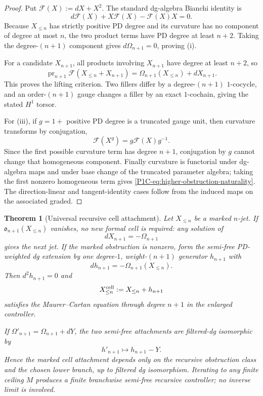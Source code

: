 \documentclass[11pt]{article}
\newtheorem{theorem}{Theorem}[section]
\theoremstyle{remark}
\begin{document}
\begin{proof}
Put $\mathcal F(X):=dX+X^2$.  The standard dg-algebra Bianchi identity is
\[
 d\mathcal F(X)+X\mathcal F(X)-\mathcal F(X)X=0.
\]
Because $X_{\le n}$ has strictly positive PD degree and its curvature has no component of degree at most $n$, the two product terms have PD degree at least $n+2$.  Taking the degree-$(n+1)$ component gives $d\Omega_{n+1}=0$, proving (i).

For a candidate $X_{n+1}$, all products involving $X_{n+1}$ have degree at least $n+2$, so
\[
 \operatorname{pr}_{n+1}\mathcal F(X_{\le n}+X_{n+1})
 =\Omega_{n+1}(X_{\le n})+dX_{n+1}.
\]
This proves the lifting criterion.  Two fillers differ by a degree-$(n+1)$ $1$-cocycle, and an order-$(n+1)$ gauge changes a filler by an exact $1$-cochain, giving the stated $H^1$ torsor.

For (iii), if $g=1+$ positive PD degree is a truncated gauge unit, then curvature transforms by conjugation,
\[
 \mathcal F(X^g)=g\mathcal F(X)g^{-1}.
\]
Since the first possible curvature term has degree $n+1$, conjugation by $g$ cannot change that homogeneous component.  Finally curvature is functorial under dg-algebra maps and under base change of the truncated parameter algebra; taking the first nonzero homogeneous term gives \eqref{P1C-eq:higher-obstruction-naturality}.  The direction-linear and tangent-identity cases follow from the induced maps on the associated graded.
\end{proof}

\begin{theorem}[Universal recursive cell attachment]\label{P1C-thm:universal-recursive-cell-attachment}
Let $X_{\le n}$ be a marked $n$-jet.  If $\mathfrak o_{n+1}(X_{\le n})$ vanishes, no new formal cell is required: any solution of
\[
 dX_{n+1}=-\Omega_{n+1}
\]
gives the next jet.  If the marked obstruction is nonzero, form the semi-free PD-weighted dg extension by one degree-$1$, weight-$(n+1)$ generator $h_{n+1}$ with
\begin{equation}\label{P1C-eq:universal-recursive-cell}
 \boxed{dh_{n+1}=-\Omega_{n+1}(X_{\le n}).}
\end{equation}
Then $d^2h_{n+1}=0$ and
\[
 X_{\le n}^{\rm cell}:=X_{\le n}+h_{n+1}
\]
satisfies the Maurer--Cartan equation through degree $n+1$ in the enlarged controller.

If $\Omega'_{n+1}=\Omega_{n+1}+dY$, the two semi-free attachments are filtered-dg isomorphic by
\[
 h'_{n+1}\longmapsto h_{n+1}-Y.
\]
Hence the marked cell attachment depends only on the recursive obstruction class and the chosen lower branch, up to filtered dg isomorphism.  Iterating to any finite ceiling $M$ produces a finite branchwise semi-free recursive controller; no inverse limit is involved.
\end{theorem}
\end{document}
